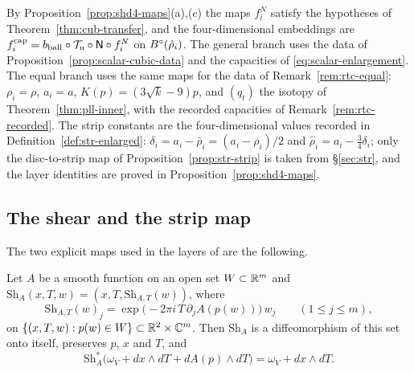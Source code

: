 \begin{remark}\label{rem:shd-four}
By Proposition~\ref{prop:shd4-maps}(a),(c) the maps $f^N_i$ satisfy the hypotheses of Theorem~\ref{thm:cub-transfer}, and
the four-dimensional embeddings are
$f^{\rm cap}_i=b_{\rm ball}\circ\mathcal T_{\rm u}\circ\mathsf N\circ f^N_i$ on $B^{\circ}(\hat\rho_i)$. The general branch uses the data of Proposition~\ref{prop:scalar-cubic-data}
and the capacities of \eqref{eq:scalar-enlargement}. The equal branch uses the same maps for the data of
Remark~\ref{rem:rtc-equal}: $\rho_i=\rho$, $a_i=a$, $K(p)=(3\sqrt k-9)p$, and $(q_t)$ the isotopy of
Theorem~\ref{thm:pll-inner}, with the recorded capacities of Remark~\ref{rem:rtc-recorded}. The strip constants are
the four-dimensional values recorded in Definition~\ref{def:str-enlarged}: $\delta_i=a_i-\bar\rho_i=(a_i-\rho_i)/2$ and
$\hat\rho_i=a_i-\frac34\delta_i$; only the disc-to-strip map of Proposition~\ref{prop:str-strip} is taken from \S\ref{sec:str},
and the layer identities are proved in Proposition~\ref{prop:shd4-maps}.
\end{remark}

\subsection{The shear and the strip map}\label{sec:shd-shear}

The two explicit maps used in the layers of  are the following.

\begin{lemma}\label{lem:hdl-shear}
Let $A$ be a smooth function on an open set $W\subset\mathbb{R}^m$ and $\mathrm{Sh}_A(x,T,w)=(x,T,\mathrm{Sh}_{A,T}(w))$, where
\[
 \mathrm{Sh}_{A,T}(w)_j=\exp\big(-2\pi i\,T\,\partial_jA(p(w))\big)\,w_j\qquad(1\le j\le m),
\]
on $\{(x,T,w):p(w)\in W\}\subset\mathbb{R}^2\times\mathbb{C}^m$. Then $\mathrm{Sh}_A$ is a diffeomorphism of this set onto itself, preserves
$p$, $x$ and $T$, and
\[
 \mathrm{Sh}_A^*\big(\omega_V+dx\wedge dT+dA(p)\wedge dT\big)=\omega_V+dx\wedge dT .
\]
\end{lemma}

